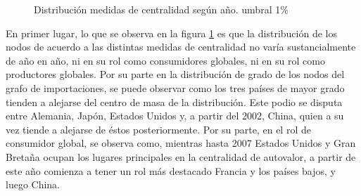 \documentclass[runningheads,a4paper]{llncs}
\begin{document}
\begin{figure}
\centering
{}
\caption{Distribución medidas de centralidad según año. umbral 1\%}
\label{fig:distribuciones}
\end{figure}


En primer lugar, lo que se observa en la figura \ref{fig:distribuciones} es que la distribución de los nodos de acuerdo a las distintas medidas de centralidad no varía sustancialmente de año en año, ni en su rol como consumidores globales, ni en su rol como productores globales. Por su parte en la distribución de grado de los nodos del grafo de importaciones, se puede observar como los tres países de mayor grado tienden a alejarse del centro de masa de la distribución.  Este podio se disputa entre Alemania, Japón, Estados Unidos y, a partir del 2002, China, quien a su vez tiende a alejarse de éstos posteriormente. Por su parte, en el rol de consumidor global, se observa como, mientras hasta 2007 Estados Unidos y Gran Bretaña ocupan los lugares principales en la centralidad de autovalor, a partir de este año comienza a tener un rol más destacado Francia y los países bajos, y luego China.      
\end{document}
